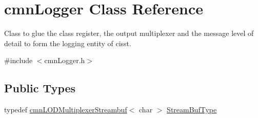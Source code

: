 \hypertarget{classcmn_logger}{}\section{cmn\+Logger Class Reference}
\label{classcmn_logger}


Class to glue the class register, the output multiplexer and the message level of detail to form the logging entity of cisst.  




{\ttfamily \#include $<$cmn\+Logger.\+h$>$}

\subsection*{Public Types}
\begin{DoxyCompactItemize}
\item 
typedef \hyperlink{classcmn_l_o_d_multiplexer_streambuf}{cmn\+L\+O\+D\+Multiplexer\+Streambuf}$<$ char $>$ \hyperlink{classcmn_logger_a7d192777882d1dc6bb48ceac0b4e65bb}{Stream\+Buf\+Type}
\end{DoxyCompactItemize}
